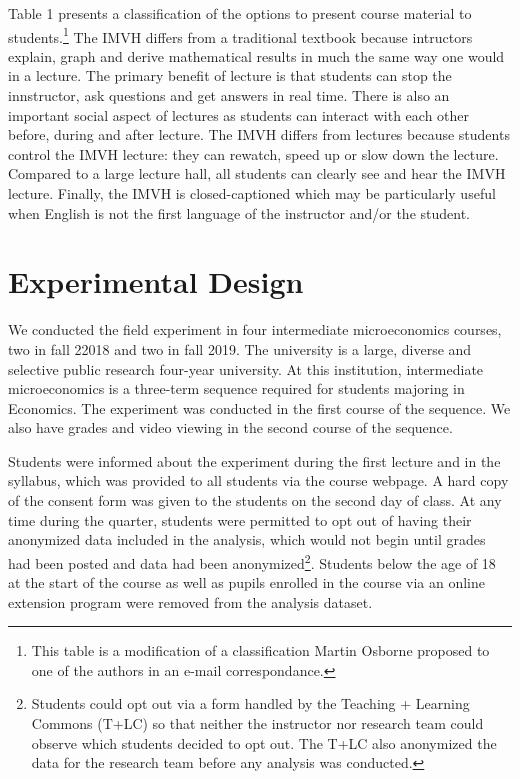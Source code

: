 \documentclass[12pt]{article}
\begin{document}
Table 1 presents a classification of the options to present course material to students.\footnote{This table is a modification of a classification Martin Osborne proposed to one of the authors in an e-mail correspondance.} The IMVH differs from a traditional textbook because intructors explain, graph and derive mathematical results in much the same way one would in a lecture.  The primary benefit of lecture is that students can stop the innstructor, ask questions and get answers in real time.  There is also an important social aspect of lectures as students can interact with each other before, during and after lecture. The IMVH differs from lectures because students control the IMVH lecture:  they can rewatch, speed up or slow down the lecture.  Compared to a large lecture hall, all students can clearly see and hear the IMVH lecture.  Finally, the IMVH is closed-captioned which may be particularly useful when English is not the first language of the instructor and/or the student.


\section{Experimental Design} \label{expdesign}
We conducted the field experiment in four intermediate microeconomics courses, two in fall 22018 and two in fall 2019.  The university is a large, diverse and selective public research four-year university. At this institution, intermediate microeconomics is a three-term sequence required for students majoring in Economics. The experiment was conducted in the first course of the sequence.  We also have grades and video viewing in the second course of the sequence.

Students were informed about the experiment during the first lecture and in the syllabus, which was provided to all students via the course webpage. A hard copy of the consent form was given to the students on the second day of class.  At any time during the quarter, students were permitted to opt out of having their anonymized data included in the analysis, which would not begin until grades had been posted and data had been anonymized\footnote{Students could opt out via a form handled by the Teaching + Learning Commons (T+LC) so that neither the instructor nor research team could observe which students decided to opt out. The T+LC also anonymized the data for the research team before any analysis was conducted.}. Students below the age of 18 at the start of the course as well as pupils enrolled in the course via an online extension program were removed from the analysis dataset.
\end{document}
